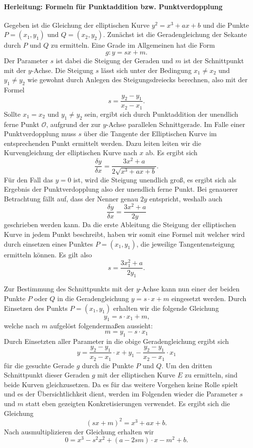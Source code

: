 \paragraph{Herleitung: Formeln für Punktaddition bzw. Punktverdopplung}
Gegeben ist die Gleichung der elliptischen Kurve $y^2 = x^3 +ax + b$ und die Punkte $P = (x_1, y_1)$ und $Q = (x_2, y_2)$. Zunächst ist die Geradengleichung der Sekante durch $P$ und $Q$ zu ermitteln. Eine Grade im Allgemeinen hat die Form $$g: y = sx + m.$$ 
Der Parameter $s$ ist dabei die Steigung der Geraden und $m$ ist der Schnittpunkt mit der $y$-Achse. Die Steigung $s$ lässt sich unter der Bedingung $x_1 \neq x_2$ und $y_1 \neq y_2$  wie gewohnt durch Anlegen des Steigungsdreiecks berechnen, also mit der Formel $$s = \frac{y_2 - y_1}{x_2  - x_1}.$$ Sollte $x_1 = x_2$ und $y_1 \neq y_2$ sein, ergibt sich durch Punktaddition der unendlich ferne Punkt $\mathcal{O}$, aufgrund der zur $y$-Achse parallelen Schnittgerade. Im Falle einer Punktverdopplung muss $s$ über die Tangente der Elliptischen Kurve im entsprechenden Punkt ermittelt werden. Dazu leiten leiten wir die Kurvengleichung der elliptischen Kurve nach $x$ ab. Es ergibt sich $$\frac{\delta y}{\delta x} = \frac{3x^2 + a}{2 \sqrt{x^3 + ax + b}}.$$ Für den Fall das $y = 0$ ist, wird die Steigung unendlich groß, es ergibt sich als Ergebnis der Punktverdopplung also der unendlich ferne Punkt. Bei genauerer Betrachtung fällt auf, dass der Nenner genau $2y$ entspricht, weshalb auch $$\frac{\delta y}{\delta x} = \frac{3x^2 + a}{2y}$$ geschrieben werden kann. Da die erste Ableitung die Steigung der elliptischen Kurve in jedem Punkt beschreibt, haben wir somit eine Formel mit welcher wird durch einsetzen eines Punktes $P = (x_1, y_1)$, die jeweilige Tangentensteigung ermitteln können. Es gilt also $$s = \frac{3x_1^2 + a}{2y_1}\text{.}$$

Zur Bestimmung des Schnittpunkts mit der $y$-Achse kann nun einer der beiden Punkte $P$ oder $Q$ in die Geradengleichung $y = s \cdot x + m$ eingesetzt werden. Durch Einsetzen des Punkts $P = (x_1, y_1)$  erhalten wir die folgende Gleichung $$y_1 = s \cdot x_1 + m\text{,}$$ welche nach $m$ aufgelöst folgendermaßen aussieht: $$m = y_1 - s \cdot x_1$$
Durch Einsetzten aller Parameter in die obige Geradengleichung ergibt sich $$y = \frac{y_2 - y_1}{x_2  - x_1} \cdot x + y_1 - \frac{y_2 - y_1}{x_2  - x_1} \cdot x_1$$ für die gesuchte Gerade $g$ durch die Punkte $P$ und $Q$. Um den dritten Schnittpunkt dieser Geraden $g$ mit der elliptischen Kurve $E$ zu ermitteln, sind beide Kurven gleichzusetzen. Da es für das weitere Vorgehen keine Rolle spielt und es der Übersichtlichkeit dient, werden im Folgenden wieder die Parameter $s$ und $m$ statt eben gezeigten Konkretisierungen verwendet. Es ergibt sich die Gleichung $$(sx+m)^2 = x^3 + ax + b\text{.}$$ Nach ausmultiplizieren der Gleichung erhalten wir $$0 =  x^3 - s^2x^2 + (a-2sm)\cdot x - m^2+b \text{.}$$

